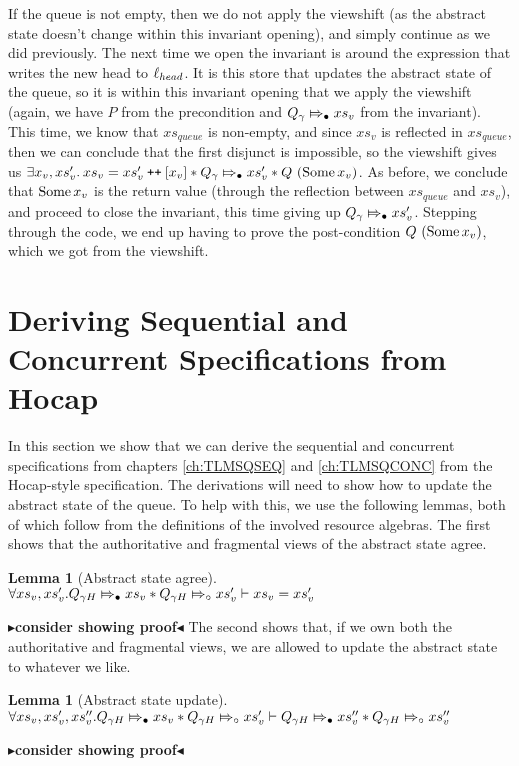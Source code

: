 \documentclass[a4paper, 11pt]{report}
\newtheorem{lemma}[theorem]{Lemma}
\newcommand{\Qg}{Q_\gname}
\newcommand\catenate{\mathbin{\text{\ttfamily\upshape ++}}}
\newcommand{\abstractstatefullfrag}[2]{#1 \Mapsto_{\circ} #2}
\newcommand{\abstractstateauth}[2]{#1 \Mapsto_{\bullet} #2}
\newcommand{\todo}[1]{{\color[rgb]{.5,0,0}\textbf{$\blacktriangleright$#1$\blacktriangleleft$}}}
\begin{document}
If the queue is not empty, then we do not apply the viewshift (as the abstract state doesn't change within this invariant opening), and simply continue as we did previously. The next time we open the invariant is around the expression that writes the new head to $\ell_{head}$. It is this store that updates the abstract state of the queue, so it is within this invariant opening that we apply the viewshift (again, we have $P$ from the precondition and $\abstractstateauth{\Qg}{xs_v}$ from the invariant). This time, we know that $xs_{queue}$ is non-empty, and since $xs_v$ is reflected in $xs_{queue}$, then we can conclude that the first disjunct is impossible, so the viewshift gives us $\Exists x_v, xs_v' . xs_v = xs_v' \catenate [x_v] \star \abstractstateauth{\Qg}{xs_v'} \star Q \ (\Some{x_v})$. As before, we conclude that $\operatorname{Some}{x_v}$ is the return value (through the reflection between $xs_{queue}$ and $xs_v$), and proceed to close the invariant, this time giving up $\abstractstateauth{\Qg}{xs_v'}$. Stepping through the code, we end up having to prove the post-condition $Q \ (\operatorname{Some}{x_v})$, which we got from the viewshift.


\section{Deriving Sequential and Concurrent Specifications from Hocap}
\label{TLMSQHOCAP:section:deriving-seq-and-conc}

In this section we show that we can derive the sequential and concurrent specifications from chapters \ref{ch:TLMSQSEQ} and \ref{ch:TLMSQCONC} from the Hocap-style specification. The derivations will need to show how to update the abstract state of the queue. To help with this, we use the following lemmas, both of which follow from the definitions of the involved resource algebras. The first shows that the authoritative and fragmental views of the abstract state agree.
\begin{lemma}[Abstract state agree]\label{TLMSQ:hocap:abst:agree}
  $\All xs_v, xs_v' .\\
  \abstractstateauth{Q_{\gname H}}{xs_v} \star \abstractstatefullfrag{Q_{\gname H}}{xs_v'} \proves xs_v = xs_v'$
\end{lemma}
\todo{consider showing proof}
The second shows that, if we own both the authoritative and fragmental views, we are allowed to update the abstract state to whatever we like.
\begin{lemma}[Abstract state update]\label{TLMSQ:hocap:abst:update}
  $\All xs_v, xs_v', xs_v'' .\\
  \abstractstateauth{Q_{\gname H}}{xs_v} \star \abstractstatefullfrag{Q_{\gname H}}{xs_v'} \proves \abstractstateauth{Q_{\gname H}}{xs_v''} \star \abstractstatefullfrag{Q_{\gname H}}{xs_v''}$
\end{lemma}
\todo{consider showing proof}
\end{document}
